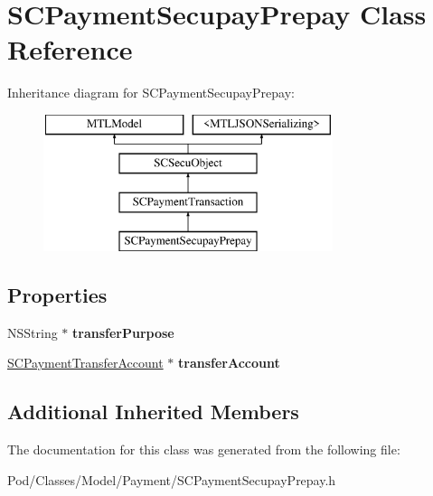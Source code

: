 \hypertarget{interface_s_c_payment_secupay_prepay}{}\section{S\+C\+Payment\+Secupay\+Prepay Class Reference}
\label{interface_s_c_payment_secupay_prepay}
Inheritance diagram for S\+C\+Payment\+Secupay\+Prepay\+:\begin{figure}[H]
\begin{center}
\leavevmode
\includegraphics[height=4.000000cm]{interface_s_c_payment_secupay_prepay}
\end{center}
\end{figure}
\subsection*{Properties}
\begin{DoxyCompactItemize}
\item 
N\+S\+String $\ast$ {\bfseries transfer\+Purpose}\hypertarget{interface_s_c_payment_secupay_prepay_a81fea911893ab7030594762ce5e95a66}{}\label{interface_s_c_payment_secupay_prepay_a81fea911893ab7030594762ce5e95a66}

\item 
\hyperlink{interface_s_c_payment_transfer_account}{S\+C\+Payment\+Transfer\+Account} $\ast$ {\bfseries transfer\+Account}\hypertarget{interface_s_c_payment_secupay_prepay_a40b50623d8b9bee73f6d2f2e012c2619}{}\label{interface_s_c_payment_secupay_prepay_a40b50623d8b9bee73f6d2f2e012c2619}

\end{DoxyCompactItemize}
\subsection*{Additional Inherited Members}


The documentation for this class was generated from the following file\+:\begin{DoxyCompactItemize}
\item 
Pod/\+Classes/\+Model/\+Payment/S\+C\+Payment\+Secupay\+Prepay.\+h\end{DoxyCompactItemize}
